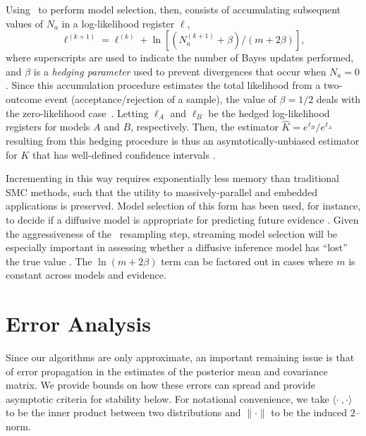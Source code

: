 \documentclass[twoside]{article}
\newcommand{\CRej}{\text{rejection filtering}}
\begin{document}
Using \CRej~to perform model selection, then, consists of accumulating
subsequent values of $N_a$ in a log-likelihood register $\ell$,
\begin{equation}
    \ell^{(k + 1)} = \ell^{(k)} + \ln\left[(N_a^{(k + 1)} + \beta) / (m + 2 \beta)\right],
\end{equation}
where superscripts are used to indicate the number of Bayes updates performed,
and  $\beta$ is a \emph{hedging parameter} used to prevent
divergences that occur when $N_a = 0$. Since this accumulation procedure
estimates the total likelihood from a two-outcome event
(acceptance/rejection of a sample), the value of $\beta = 1 / 2$ deals with the zero-likelihood case~\cite{ferrie_estimating_2012}.
Letting $\ell_A$ and $\ell_B$ be the hedged log-likelihood registers for models $A$ and $B$,
respectively. Then, the estimator $\hat{K} = e^{\ell_B} / e^{\ell_A}$ resulting from this hedging procedure
is thus an asymtotically-unbiased estimator for $K$ that has well-defined
confidence intervals \cite{cho_approximate_2013}.


Incrementing in this way requires exponentially less memory than traditional SMC methods, such that the utility
to massively-parallel and embedded applications is preserved.
Model selection of this form has been used, for instance, to decide if
a diffusive model is appropriate for predicting future evidence \cite{granade_characterization_2015}.
Given the aggressiveness of the \CRej~resampling step, streaming model selection
will be especially important in assessing whether a diffusive inference model has
``lost'' the true value \cite{wiebe_efficient_2015}. The $\ln(m + 2\beta)$ term can be factored out in cases where $m$ is constant across models and evidence.

\section{Error Analysis}
\label{sec:error-analysis}

Since our algorithms are only approximate, an important remaining issue is that of error propagation in the estimates of the posterior mean
and covariance matrix.  We provide bounds on how these errors can spread and provide asymptotic criteria for stability below.  For notational convenience,
we take $\langle \cdot\!~,\cdot \rangle$ to be the inner product between two distributions and $\|\cdot\|$ to be the induced $2$--norm.
\end{document}
